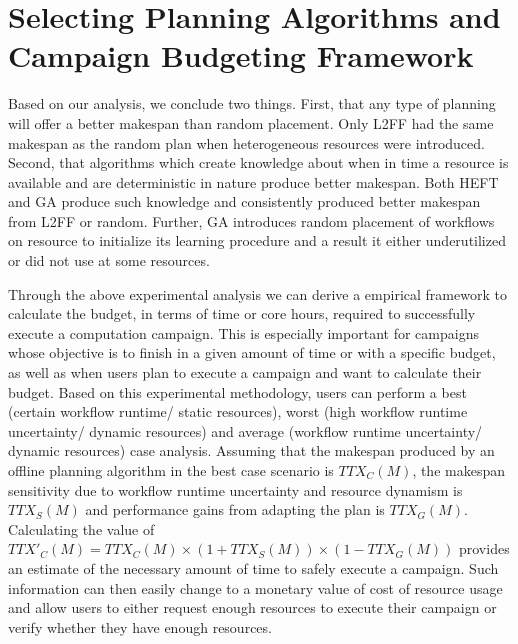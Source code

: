 \section{Selecting Planning Algorithms and Campaign Budgeting Framework}
\label{sec:cf_algo_sel}
Based on our analysis, we conclude two things.
First, that any type of planning will offer a better makespan than random placement.
Only L2FF had the same makespan as the random plan when heterogeneous resources were introduced.
Second, that algorithms which create knowledge about when in time a resource is available and are deterministic in nature produce better makespan.
Both HEFT and GA produce such knowledge and consistently produced better makespan from L2FF or random.
Further, GA introduces random placement of workflows on resource to initialize its learning procedure and a result it either underutilized or did not use at some resources.

Through the above experimental analysis we can derive a empirical framework to calculate the budget, in terms of time or core hours, required to successfully execute a computation campaign.
This is especially important for campaigns whose objective is to finish in a given amount of time or with a specific budget, as well as when users plan to execute a campaign and want to calculate their budget.
Based on this experimental methodology, users can perform a best (certain workflow runtime/ static resources), worst (high workflow runtime uncertainty/ dynamic resources) and average (workflow runtime uncertainty/ dynamic resources) case analysis.
Assuming that the makespan produced by an offline planning algorithm in the best case scenario is $TTX_{C}(M)$, the makespan sensitivity due to workflow runtime uncertainty and resource dynamism is $TTX_{S}(M)$ and performance gains from adapting the plan is $TTX_{G}(M)$.
Calculating the value of $TTX'_{C}(M) = TTX_{C}(M) \times (1 + TTX_{S}(M))\times ( 1 - TTX_{G}(M))$ provides an estimate of the necessary amount of time to safely execute a campaign.
Such information can then easily change to a monetary value of cost of resource usage and allow users to either request enough resources to execute their campaign or verify whether they have enough resources.

